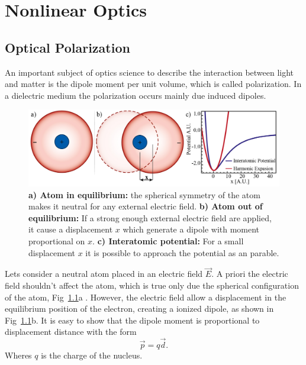 \chapter{Nonlinear Optics}
\section{Optical Polarization}
An important subject of optics science to describe the interaction between light and matter is the dipole moment per unit volume, which is called polarization. In a dielectric medium the polarization occurs mainly due induced dipoles.

\begin{figure}[h!]
    \centering
    \includegraphics[width = 16cm]{figuras/Dissertation_atomic_polarization.jpg}
    \caption{\textbf{a) Atom in equilibrium:} the spherical symmetry of the atom makes it neutral for any external electric field. \textbf{b) Atom out of equilibrium:} If a strong enough external electric field are applied, it cause a displacement $x$ which generate a dipole with moment proportional on $x$. \textbf{c) Interatomic potential:} For a small displacement $x$ it is possible to approach the potential as an parable.}
    \label{fig:polarization}
\end{figure}
Lets consider a neutral atom placed in an electric field $\vec{E}$. A priori the electric field shouldn't affect the atom, which is true only due the spherical configuration of the atom, Fig~\ref{fig:polarization}a
. However, the electric field allow a displacement in the equilibrium position of the electron, creating a ionized dipole, as shown in Fig~\ref{fig:polarization}b. It is easy to show that the dipole moment is proportional to displacement distance with the form
\begin{equation}
    \vec{p} = q\vec{d}.
\end{equation}
Wheres $q$ is the charge of the nucleus. 

